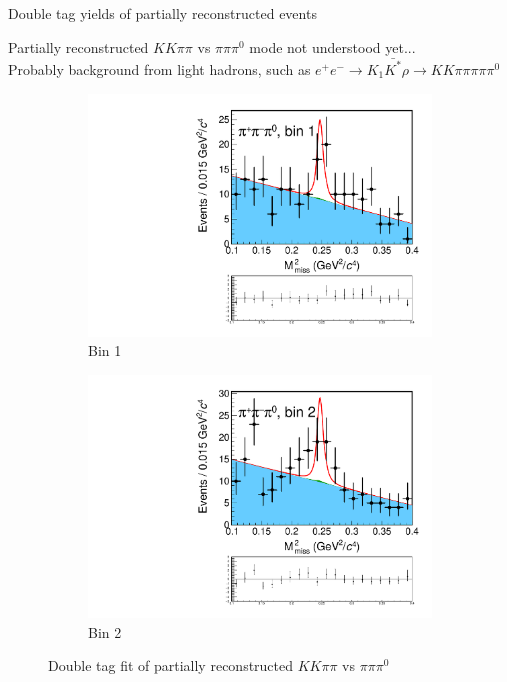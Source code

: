 \documentclass{beamer}
\begin{document}
\begin{frame}{Double tag yields of partially reconstructed events}
  \begin{center}
    Partially reconstructed $KK\pi\pi$ vs $\pi\pi\pi^0$ mode not understood yet...\\
    Probably background from light hadrons, such as $e^+e^-\to K_1\bar{K^*}\rho\to KK\pi\pi\pi\pi\pi^0$
  \end{center}
  \begin{figure}
    \centering
    \begin{subfigure}{0.4\textwidth}
      \includegraphics[width = 1.0\textwidth,trim={0 5cm 0 0},clip=true]{Plots/DoubleTagYield_DoubleTag_CP_KKpipi_vs_pipipi0PartReco_SignalBin1.pdf}
      \caption{Bin 1}
    \end{subfigure}%
    \begin{subfigure}{0.4\textwidth}
      \includegraphics[width = 1.0\textwidth,trim={0 5cm 0 0},clip=true]{Plots/DoubleTagYield_DoubleTag_CP_KKpipi_vs_pipipi0PartReco_SignalBin2.pdf}
      \caption{Bin 2}
    \end{subfigure}
    \caption{Double tag fit of partially reconstructed $KK\pi\pi$ vs $\pi\pi\pi^0$}
  \end{figure}
\end{frame}
\end{document}
